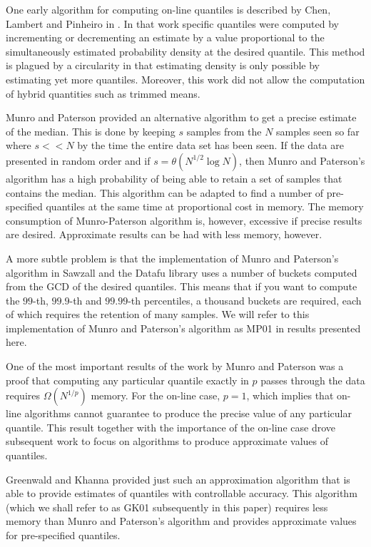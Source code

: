 \documentclass[11pt]{amsart}
\begin{document}
One early algorithm for computing on-line quantiles is described by Chen, Lambert and Pinheiro in \cite{Chen2000}.  In that work specific quantiles were computed by incrementing or decrementing an estimate by a value proportional to the simultaneously estimated probability density at the desired quantile.  This method is plagued by a circularity in that estimating density is only possible by estimating yet more quantiles.  Moreover, this work did not allow the computation of hybrid quantities such as trimmed means.

Munro and Paterson\cite{munro1980} provided an alternative algorithm to get a precise estimate of the median.  This is done by keeping $s$ samples from the $N$ samples seen so far where $s << N$ by the time the entire data set has been seen.  If the data are presented in random order and if $s = \theta(N^{1/2} \log N)$, then Munro and Paterson's algorithm has a high probability of being able to retain a set of samples that contains the median.  This algorithm can be adapted to find a number of pre-specified quantiles at the same time at proportional cost in memory.  The memory consumption of Munro-Paterson algorithm is, however, excessive if precise results are desired.  Approximate results can be had with less memory, however.  

A more subtle problem is that the implementation of Munro and Paterson's algorithm in Sawzall\cite{sawzall} and the Datafu library\cite{datafu} uses a number of buckets computed from the GCD of the desired quantiles.  This means that if you want to compute the $99$-th, $99.9$-th and $99.99$-th percentiles, a thousand buckets are required, each of which requires the retention of many samples. We will refer to this implementation of Munro and Paterson's algorithm as MP01 in results presented here.

One of the most important results of the work by Munro and Paterson was a proof that computing any particular quantile exactly in $p$ passes through the data requires $\Omega(N^{1/p})$ memory. For the on-line case, $p=1$, which implies that on-line algorithms cannot guarantee to produce the precise value of any particular quantile. This result together with the importance of the on-line case drove subsequent work to focus on algorithms to produce approximate values of quantiles.

Greenwald and Khanna\cite{Greenwald-space-efficient-online-quantiles} provided just such an approximation algorithm that is able to provide estimates of quantiles with controllable accuracy. This algorithm (which we shall refer to as GK01 subsequently in this paper) requires less memory than Munro and Paterson's algorithm and provides approximate values for pre-specified quantiles.
\end{document}

